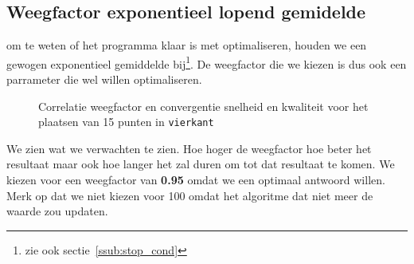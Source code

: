 \subsection{Weegfactor exponentieel lopend gemidelde}
\label{sub:weightingFactor}
om te weten of het programma klaar is met optimaliseren, houden we een gewogen exponentieel gemiddelde bij\footnote{zie ook sectie~\ref{ssub:stop_cond}}. De weegfactor die we kiezen is dus ook een parrameter die wel willen optimaliseren.
\begin{figure}[H]
\caption{Correlatie weegfactor en convergentie snelheid en kwaliteit voor het plaatsen van 15 punten in \texttt{vierkant}}
\label{graf:weightingFactor}
\end{figure}
We zien wat we verwachten te zien. Hoe hoger de weegfactor hoe beter het resultaat maar ook hoe langer het zal duren om tot dat resultaat te komen. 
We kiezen voor een weegfactor van \textbf{0.95} omdat we een optimaal antwoord willen. Merk op dat we niet kiezen voor 100 omdat het algoritme dat niet meer de waarde zou updaten. 

%